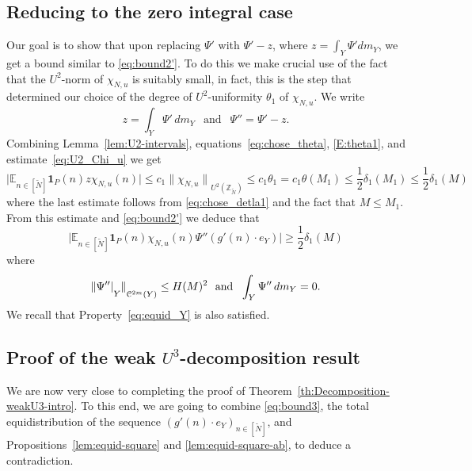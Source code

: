 \documentclass[11pt]{amsart}
\theoremstyle{definition}
\begin{document}
\subsection{Reducing to the zero integral case}\label{SS:zero}
Our goal is to show that upon replacing   $\Psi'$ with $\Psi'-z$,
where $z=\int_Y \Psi' dm_Y$, we get a bound similar to
\eqref{eq:bound2'}. To do this we make crucial use of the fact that
the $U^2$-norm of $\chi_{N,u}$ is suitably small, in fact, this is
the step that determined our choice of the degree of
$U^2$-uniformity $\theta_1$ of $\chi_{N,u}$.
 We write
$$
z=\int_{Y}\Psi'\,dm_{Y}\ \ \text{ and }\ \ \Psi''=\Psi'-z.
$$
Combining Lemma~\ref{lem:U2-intervals},
equations~\eqref{eq:chose_theta}, \eqref{E:theta1}, and
estimate~\eqref{eq:U2_Chi_u} we get
$$
 \big|{{\mathbb E}}_{n\in [{{\widetilde N}}]}
{\mathbf{1}}_{P}(n) z \chi_{N,u}(n) \big|\leq
 c_1{\lVert {\chi_{N,u}} \rVert}_{U^2({{\mathbb Z}}_{{\widetilde N}})}\leq c_1\theta_1=c_1\theta(M_1)\leq
\frac 12\delta_1(M_1)\leq\frac 12\delta_1(M)
$$
where the last estimate follows from \eqref{eq:chose_detla1}  and the fact that
$M\leq M_1$.
From this estimate and  \eqref{eq:bound2'} we deduce that
\begin{equation}
\label{eq:bound3} \bigl| {{\mathbb E}}_{n\in [{{\widetilde N}}]}{\mathbf{1}}_{P}(n)\chi_{N,u}(n)
\Psi''(g'(n)\cdot e_{Y})\bigr|\geq \frac 12\delta_1(M)
\end{equation}
where
\begin{equation} \label{eq:CmPsiPrime}
{\lVert {\Psi''|\raise-2mm\hbox{$\scriptstyle Y$}} \rVert}_{{{\mathcal C}}^{2m}(Y)}\leq
H(M)^2\ \text{ and } \ \int_{Y}\Psi''\,dm_{Y}=0.
\end{equation}
We recall that Property~\eqref{eq:equid_Y} is also satisfied.
\subsection{Proof of the weak $U^3$-decomposition
result}\label{SS:ProofFinally} We are now very close to completing
the proof of Theorem~\ref{th:Decomposition-weakU3-intro}. To this
end, we are going to   combine \eqref{eq:bound3},
 the total equidistribution of the sequence $(g'(n)\cdot e_{Y})_{n\in [{{\widetilde N}}]}$, and
 Propositions~\ref{lem:equid-square} and  \ref{lem:equid-square-ab}, to deduce a contradiction.
\end{document}
